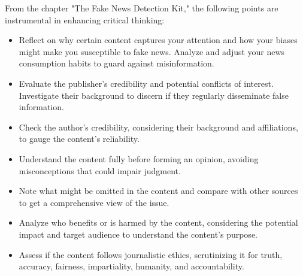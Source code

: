 \documentclass[12pt]{article}
\begin{document}
From the chapter "The Fake News Detection Kit," the following points are instrumental in enhancing critical thinking:
\begin{itemize}
  \item Reflect on why certain content captures your attention and how your biases might make you susceptible to fake news. Analyze and adjust your news consumption habits to guard against misinformation.
  \item Evaluate the publisher's credibility and potential conflicts of interest. Investigate their background to discern if they regularly disseminate false information.
  \item Check the author's credibility, considering their background and affiliations, to gauge the content's reliability.
  \item Understand the content fully before forming an opinion, avoiding misconceptions that could impair judgment.
  \item Note what might be omitted in the content and compare with other sources to get a comprehensive view of the issue.
  \item Analyze who benefits or is harmed by the content, considering the potential impact and target audience to understand the content's purpose.
  \item Assess if the content follows journalistic ethics, scrutinizing it for truth, accuracy, fairness, impartiality, humanity, and accountability.
\end{itemize}
\end{document}
